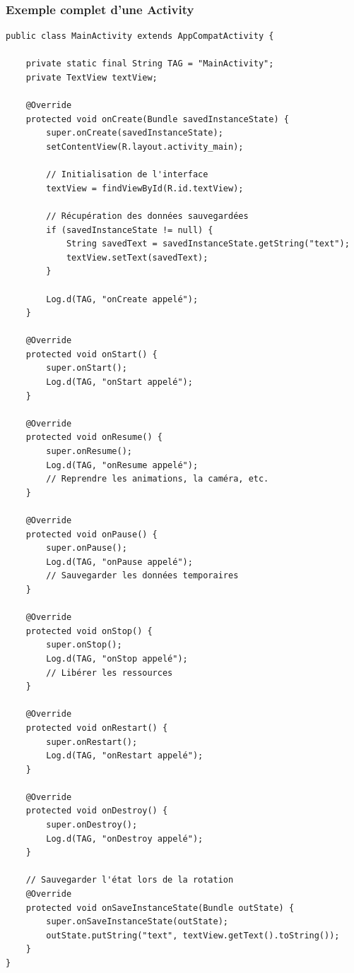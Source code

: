\documentclass[11pt,a4paper]{article}
\begin{document}
\subsubsection{Exemple complet d'une Activity}

\begin{lstlisting}
public class MainActivity extends AppCompatActivity {
    
    private static final String TAG = "MainActivity";
    private TextView textView;
    
    @Override
    protected void onCreate(Bundle savedInstanceState) {
        super.onCreate(savedInstanceState);
        setContentView(R.layout.activity_main);
        
        // Initialisation de l'interface
        textView = findViewById(R.id.textView);
        
        // Récupération des données sauvegardées
        if (savedInstanceState != null) {
            String savedText = savedInstanceState.getString("text");
            textView.setText(savedText);
        }
        
        Log.d(TAG, "onCreate appelé");
    }
    
    @Override
    protected void onStart() {
        super.onStart();
        Log.d(TAG, "onStart appelé");
    }
    
    @Override
    protected void onResume() {
        super.onResume();
        Log.d(TAG, "onResume appelé");
        // Reprendre les animations, la caméra, etc.
    }
    
    @Override
    protected void onPause() {
        super.onPause();
        Log.d(TAG, "onPause appelé");
        // Sauvegarder les données temporaires
    }
    
    @Override
    protected void onStop() {
        super.onStop();
        Log.d(TAG, "onStop appelé");
        // Libérer les ressources
    }
    
    @Override
    protected void onRestart() {
        super.onRestart();
        Log.d(TAG, "onRestart appelé");
    }
    
    @Override
    protected void onDestroy() {
        super.onDestroy();
        Log.d(TAG, "onDestroy appelé");
    }
    
    // Sauvegarder l'état lors de la rotation
    @Override
    protected void onSaveInstanceState(Bundle outState) {
        super.onSaveInstanceState(outState);
        outState.putString("text", textView.getText().toString());
    }
}
\end{lstlisting}
\end{document}
